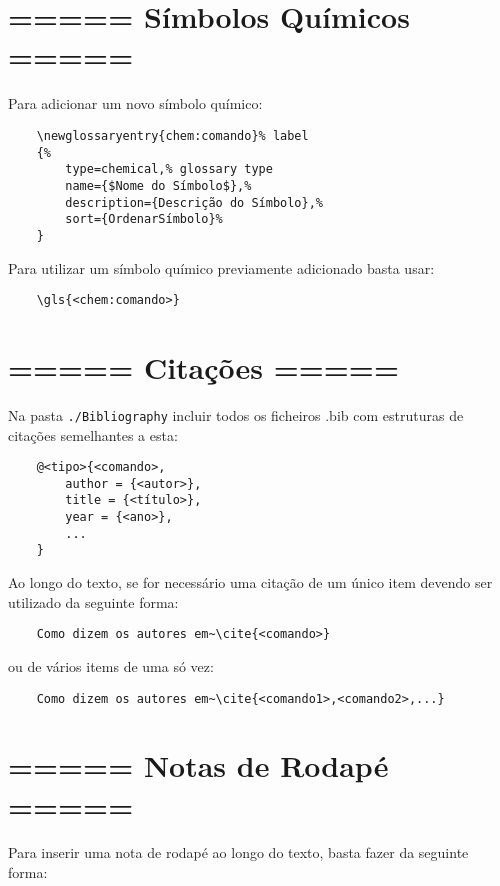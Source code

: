 \section{===== Símbolos Químicos =====}

Para adicionar um novo símbolo químico:

\begin{verbatim}
    \newglossaryentry{chem:comando}% label
    {%
        type=chemical,% glossary type
        name={$Nome do Símbolo$},%
        description={Descrição do Símbolo},%
        sort={OrdenarSímbolo}%
    }
\end{verbatim}

Para utilizar um símbolo químico previamente adicionado basta usar:

\begin{verbatim}
    \gls{<chem:comando>}
\end{verbatim}


\section{===== Citações =====}

Na pasta \verb|./Bibliography| incluir todos os ficheiros .bib com estruturas de citações semelhantes a esta:

\begin{verbatim}
    @<tipo>{<comando>,
        author = {<autor>},
        title = {<título>},
        year = {<ano>},
        ...
    }
\end{verbatim}

Ao longo do texto, se for necessário uma citação de um único item devendo ser utilizado da seguinte forma:

\begin{verbatim}
    Como dizem os autores em~\cite{<comando>}
\end{verbatim}

ou de vários items de uma só vez:

\begin{verbatim}
    Como dizem os autores em~\cite{<comando1>,<comando2>,...}
\end{verbatim}


\section{===== Notas de Rodapé =====}

Para inserir uma nota de rodapé ao longo do texto, basta fazer da seguinte forma:

